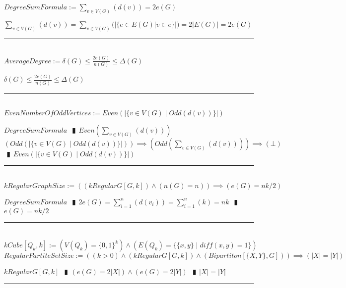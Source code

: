 \documentclass{book}
\newcommand{\abr}{:=}
\newcommand{\pipe}{$\phantom{(}\vrectangleblack\phantom{)}$}
\newcommand{\st}{\mathbin{|}}
\newcommand{\utup}[1]{\{#1\}}
\begin{document}
$DegreeSumFormula \abr \sum \limits_{v \in V(G)}(d(v)) = 2 e(G)$
\begin{enumerate}
  \lit $\sum \limits_{v \in V(G)}(d(v)) = \sum \limits_{v \in V(G)}(|\{e \in E(G) | v \in e\}|) = 2 |E(G)| = 2 e(G)$
\end{enumerate} \vspace{.75mm} \hrule \vspace{.75mm} \ \\ 

$AverageDegree \abr \delta(G) \leq \frac{2 e(G)}{n(G)} \leq \Delta(G)$
\begin{enumerate}
  \lit$ \delta(G) \leq \frac{2 e(G)}{n(G)} \leq \Delta(G)$
\end{enumerate} \vspace{.75mm} \hrule \vspace{.75mm} \ \\ 

$EvenNumberOfOddVertices \abr Even(|\{v \in V(G) \st Odd(d(v))\}|)$
\begin{enumerate}
  \lit $DegreeSumFormula$ \pipe $Even(\sum \limits_{v \in V(G)}(d(v)))$
  \lit $(Odd(|\{v \in V(G) \st Odd(d(v))\}|)) \implies (Odd(\sum \limits_{v \in V(G)}(d(v)))) \implies (\bot)$ \pipe $Even(|\{v \in V(G) \st Odd(d(v))\}|)$
\end{enumerate} \vspace{.75mm} \hrule \vspace{.75mm} \ \\ 

$kRegularGraphSize \abr ((kRegularG[G, k]) \land (n(G) = n)) \implies (e(G) = n k / 2)$
\begin{enumerate}
  \lit $DegreeSumFormula$ \pipe $2 e(G) = \sum \limits_{i = 1}^{n}(d(v_i)) = \sum \limits_{i = 1}^{n}(k) = n k$ \pipe $e(G) = n k / 2$
\end{enumerate} \vspace{.75mm} \hrule \vspace{.75mm} \ \\ 

$kCube[Q_k, k] \abr (V(Q_k) = \{0, 1\}^k) \land (E(Q_k) = \{\utup{x, y} \st diff(x, y) = 1\})$ \\

$RegularPartiteSetSize \abr ((k > 0) \land (kRegularG[G, k]) \land (Bipartiton[\{X, Y\}, G])) \implies (|X| = |Y|)$
\begin{enumerate}
  \lit $kRegularG[G, k]$ \pipe $(e(G) = 2 |X|) \land (e(G) = 2 |Y|)$ \pipe $|X| = |Y|$
\end{enumerate} \vspace{.75mm} \hrule \vspace{.75mm} \ \\ 
\end{document}
